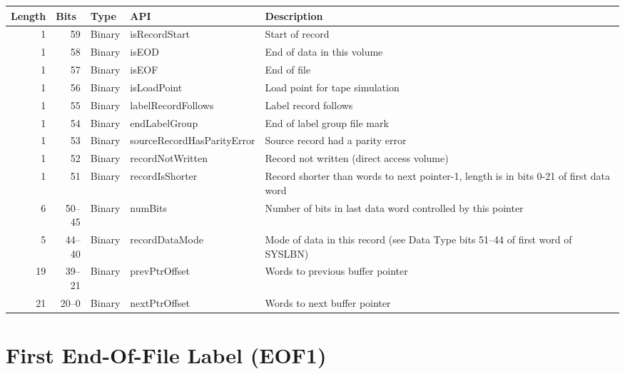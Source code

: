 \documentclass{report}
\newcommand{\controlworddesc}[1]{
\begin{center}
\begin{tabular}[t]{rrlTp{8.0cm}}
Length & \multicolumn{1}{l}{Bits} & Type & API & Description \\
\midrule
#1
\end{tabular}
\end{center}
}
\begin{document}
\controlworddesc{
 1 &     59 & Binary & isRecordStart              & Start of record \\
 1 &     58 & Binary & isEOD                      & End of data in this volume \\
 1 &     57 & Binary & isEOF                      & End of file \\
 1 &     56 & Binary & isLoadPoint                & Load point for tape simulation \\
 1 &     55 & Binary & labelRecordFollows         & Label record follows \\
 1 &     54 & Binary & endLabelGroup              & End of label group file mark \\
 1 &     53 & Binary & sourceRecordHasParityError & Source record had a parity error \\
 1 &     52 & Binary & recordNotWritten           & Record not written (direct access volume) \\
 1 &     51 & Binary & recordIsShorter            & Record shorter than words to next pointer-1, length is in bits 0-21 of first data word \\
 6 & 50--45 & Binary & numBits                    & Number of bits in last data word controlled by this pointer \\
 5 & 44--40 & Binary & recordDataMode             & Mode of data in this record (see Data Type bits 51--44 of first word of SYSLBN) \\
19 & 39--21 & Binary & prevPtrOffset              & Words to previous buffer pointer \\
21 & 20--0  & Binary & nextPtrOffset              & Words to next buffer pointer \\
}



\section{First End-Of-File Label (EOF1)}
\end{document}
